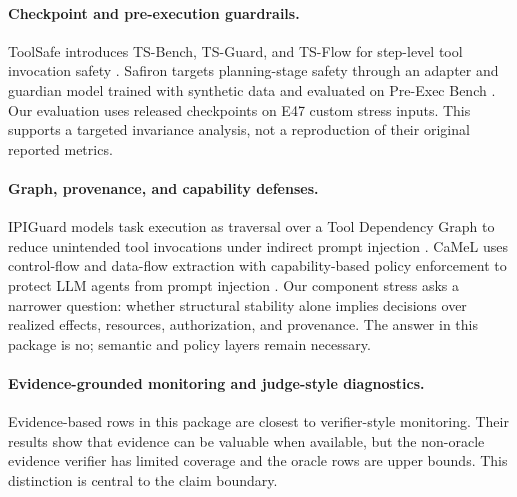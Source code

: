 \documentclass[11pt]{article}
\begin{document}
\paragraph{Checkpoint and pre-execution guardrails.}
ToolSafe introduces TS-Bench, TS-Guard, and TS-Flow for step-level tool invocation safety \citep{mou2026toolsafe}. Safiron targets planning-stage safety through an adapter and guardian model trained with synthetic data and evaluated on Pre-Exec Bench \citep{huang2025safiron}. Our evaluation uses released checkpoints on E47 custom stress inputs. This supports a targeted invariance analysis, not a reproduction of their original reported metrics.

\paragraph{Graph, provenance, and capability defenses.}
IPIGuard models task execution as traversal over a Tool Dependency Graph to reduce unintended tool invocations under indirect prompt injection \citep{an2025ipiguard}. CaMeL uses control-flow and data-flow extraction with capability-based policy enforcement to protect LLM agents from prompt injection \citep{debenedetti2025camel}. Our component stress asks a narrower question: whether structural stability alone implies decisions over realized effects, resources, authorization, and provenance. The answer in this package is no; semantic and policy layers remain necessary.

\paragraph{Evidence-grounded monitoring and judge-style diagnostics.}
Evidence-based rows in this package are closest to verifier-style monitoring. Their results show that evidence can be valuable when available, but the non-oracle evidence verifier has limited coverage and the oracle rows are upper bounds. This distinction is central to the claim boundary.
\end{document}
